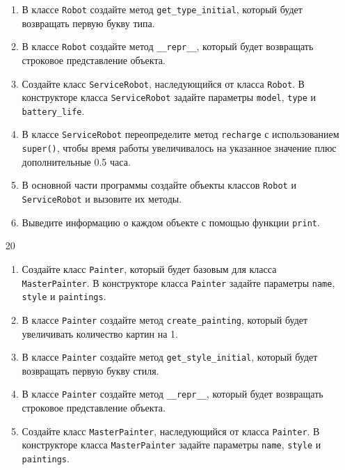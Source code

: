 \begin{enumerate}
\begin{enumerate}
    \item В классе \texttt{Robot} создайте метод \texttt{get\_type\_initial}, который будет возвращать первую букву типа.
    
    \item В классе \texttt{Robot} создайте метод \texttt{\_\_repr\_\_}, который будет возвращать строковое представление объекта.
    
    \item Создайте класс \texttt{ServiceRobot}, наследующийся от класса \texttt{Robot}. В конструкторе класса \texttt{ServiceRobot} задайте параметры \texttt{model}, \texttt{type} и \texttt{battery\_life}.
    
    \item В классе \texttt{ServiceRobot} переопределите метод \texttt{recharge} с использованием \texttt{super()}, чтобы время работы увеличивалось на указанное значение плюс дополнительные 0.5 часа.
    
    \item В основной части программы создайте объекты классов \texttt{Robot} и \texttt{ServiceRobot} и вызовите их методы.
    
    \item Выведите информацию о каждом объекте с помощью функции \texttt{print}.
\end{enumerate}

\item[20] 
\begin{enumerate}
    \item Создайте класс \texttt{Painter}, который будет базовым для класса \texttt{MasterPainter}. В конструкторе класса \texttt{Painter} задайте параметры \texttt{name}, \texttt{style} и \texttt{paintings}.
    
    \item В классе \texttt{Painter} создайте метод \texttt{create\_painting}, который будет увеличивать количество картин на 1.
    
    \item В классе \texttt{Painter} создайте метод \texttt{get\_style\_initial}, который будет возвращать первую букву стиля.
    
    \item В классе \texttt{Painter} создайте метод \texttt{\_\_repr\_\_}, который будет возвращать строковое представление объекта.
    
    \item Создайте класс \texttt{MasterPainter}, наследующийся от класса \texttt{Painter}. В конструкторе класса \texttt{MasterPainter} задайте параметры \texttt{name}, \texttt{style} и \texttt{paintings}.
    

\end{enumerate}
\end{enumerate}

